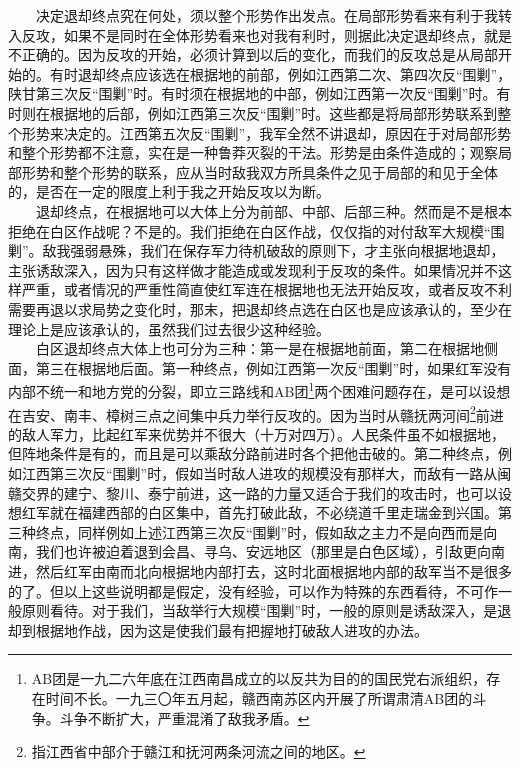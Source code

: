 \documentclass[cn,11pt,chinese]{elegantbook}
\begin{document}
　　决定退却终点究在何处，须以整个形势作出发点。在局部形势看来有利于我转入反攻，如果不是同时在全体形势看来也对我有利时，则据此决定退却终点，就是不正确的。因为反攻的开始，必须计算到以后的变化，而我们的反攻总是从局部开始的。有时退却终点应该选在根据地的前部，例如江西第二次、第四次反“围剿”，陕甘第三次反“围剿”时。有时须在根据地的中部，例如江西第一次反“围剿”时。有时则在根据地的后部，例如江西第三次反“围剿”时。这些都是将局部形势联系到整个形势来决定的。江西第五次反“围剿”，我军全然不讲退却，原因在于对局部形势和整个形势都不注意，实在是一种鲁莽灭裂的干法。形势是由条件造成的；观察局部形势和整个形势的联系，应从当时敌我双方所具条件之见于局部的和见于全体的，是否在一定的限度上利于我之开始反攻以为断。\\
　　退却终点，在根据地可以大体上分为前部、中部、后部三种。然而是不是根本拒绝在白区作战呢？不是的。我们拒绝在白区作战，仅仅指的对付敌军大规模“围剿”。敌我强弱悬殊，我们在保存军力待机破敌的原则下，才主张向根据地退却，主张诱敌深入，因为只有这样做才能造成或发现利于反攻的条件。如果情况并不这样严重，或者情况的严重性简直使红军连在根据地也无法开始反攻，或者反攻不利需要再退以求局势之变化时，那末，把退却终点选在白区也是应该承认的，至少在理论上是应该承认的，虽然我们过去很少这种经验。\\
　　白区退却终点大体上也可分为三种：第一是在根据地前面，第二在根据地侧面，第三在根据地后面。第一种终点，例如江西第一次反“围剿”时，如果红军没有内部不统一和地方党的分裂，即立三路线和AB团\footnote[42]{ AB团是一九二六年底在江西南昌成立的以反共为目的的国民党右派组织，存在时间不长。一九三〇年五月起，赣西南苏区内开展了所谓肃清AB团的斗争。斗争不断扩大，严重混淆了敌我矛盾。}两个困难问题存在，是可以设想在吉安、南丰、樟树三点之间集中兵力举行反攻的。因为当时从赣抚两河间\footnote[43]{ 指江西省中部介于赣江和抚河两条河流之间的地区。}前进的敌人军力，比起红军来优势并不很大（十万对四万）。人民条件虽不如根据地，但阵地条件是有的，而且是可以乘敌分路前进时各个把他击破的。第二种终点，例如江西第三次反“围剿”时，假如当时敌人进攻的规模没有那样大，而敌有一路从闽赣交界的建宁、黎川、泰宁前进，这一路的力量又适合于我们的攻击时，也可以设想红军就在福建西部的白区集中，首先打破此敌，不必绕道千里走瑞金到兴国。第三种终点，同样例如上述江西第三次反“围剿”时，假如敌之主力不是向西而是向南，我们也许被迫着退到会昌、寻乌、安远地区（那里是白色区域），引敌更向南进，然后红军由南而北向根据地内部打去，这时北面根据地内部的敌军当不是很多的了。但以上这些说明都是假定，没有经验，可以作为特殊的东西看待，不可作一般原则看待。对于我们，当敌举行大规模“围剿”时，一般的原则是诱敌深入，是退却到根据地作战，因为这是使我们最有把握地打破敌人进攻的办法。\\
\end{document}
